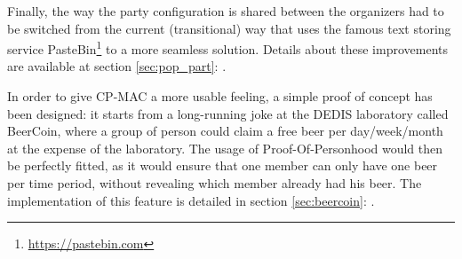 \begin{description}[style=nextline]
	Finally, the way the party configuration is shared between the organizers had to be switched from the current (transitional) way that uses the famous text storing service PasteBin\footnote{\url{https://pastebin.com}} to a more seamless solution. Details about these improvements are available at section \ref{sec:pop_part}: .
	\item[Proof of concept] In order to give CP-MAC a more usable feeling, a simple proof of concept has been designed: it starts from a long-running joke at the DEDIS laboratory called BeerCoin, where a group of person could claim a free beer per day/week/month at the expense of the laboratory. The usage of Proof-Of-Personhood would then be perfectly fitted, as it would ensure that one member can only have one beer per time period, without revealing which member already had his beer. The implementation of this feature is detailed in section \ref{sec:beercoin}: .
\end{description}